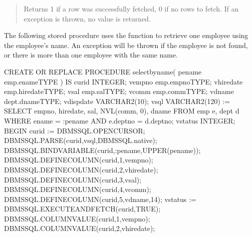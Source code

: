 \documentclass[letterpaper,10pt,english,openany,oneside]{sphinxmanual}
\begin{document}
\begin{quote}

Returns 1 if a row was successfully fetched, 0 if no rows to fetch. If
an exception is thrown, no value is returned.
\end{quote}


The following stored procedure uses the  function to
retrieve one employee using the employee’s name. An exception will be
thrown if the employee is not found, or there is more than one employee
with the same name.

%
\begin{sphinxVerbatim}[commandchars=\\\{\}]
CREATE OR REPLACE PROCEDURE select\PYGZus{}by\PYGZus{}name(
    p\PYGZus{}ename         emp.ename\PYGZpc{}TYPE
)
IS
    curid           INTEGER;
    v\PYGZus{}empno         emp.empno\PYGZpc{}TYPE;
    v\PYGZus{}hiredate      emp.hiredate\PYGZpc{}TYPE;
    v\PYGZus{}sal           emp.sal\PYGZpc{}TYPE;
    v\PYGZus{}comm          emp.comm\PYGZpc{}TYPE;
    v\PYGZus{}dname         dept.dname\PYGZpc{}TYPE;
    v\PYGZus{}disp\PYGZus{}date     VARCHAR2(10);
    v\PYGZus{}sql           VARCHAR2(120) := \PYGZsq{}SELECT empno, hiredate, sal, \PYGZsq{} \textbar{}\textbar{}
                                     \PYGZsq{}NVL(comm, 0), dname \PYGZsq{} \textbar{}\textbar{}
                                     \PYGZsq{}FROM emp e, dept d \PYGZsq{} \textbar{}\textbar{}
                                     \PYGZsq{}WHERE ename = :p\PYGZus{}ename \PYGZsq{} \textbar{}\textbar{}
                                     \PYGZsq{}AND e.deptno = d.deptno\PYGZsq{};
    v\PYGZus{}status        INTEGER;
BEGIN
    curid := DBMS\PYGZus{}SQL.OPEN\PYGZus{}CURSOR;
    DBMS\PYGZus{}SQL.PARSE(curid,v\PYGZus{}sql,DBMS\PYGZus{}SQL.native);
    DBMS\PYGZus{}SQL.BIND\PYGZus{}VARIABLE(curid,\PYGZsq{}:p\PYGZus{}ename\PYGZsq{},UPPER(p\PYGZus{}ename));
    DBMS\PYGZus{}SQL.DEFINE\PYGZus{}COLUMN(curid,1,v\PYGZus{}empno);
    DBMS\PYGZus{}SQL.DEFINE\PYGZus{}COLUMN(curid,2,v\PYGZus{}hiredate);
    DBMS\PYGZus{}SQL.DEFINE\PYGZus{}COLUMN(curid,3,v\PYGZus{}sal);
    DBMS\PYGZus{}SQL.DEFINE\PYGZus{}COLUMN(curid,4,v\PYGZus{}comm);
    DBMS\PYGZus{}SQL.DEFINE\PYGZus{}COLUMN(curid,5,v\PYGZus{}dname,14);
    v\PYGZus{}status := DBMS\PYGZus{}SQL.EXECUTE\PYGZus{}AND\PYGZus{}FETCH(curid,TRUE);
    DBMS\PYGZus{}SQL.COLUMN\PYGZus{}VALUE(curid,1,v\PYGZus{}empno);
    DBMS\PYGZus{}SQL.COLUMN\PYGZus{}VALUE(curid,2,v\PYGZus{}hiredate);

\end{sphinxVerbatim}
\end{document}
